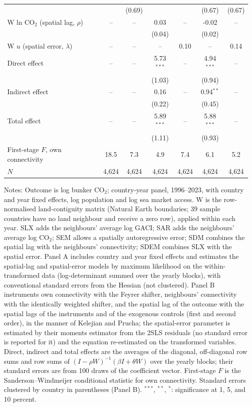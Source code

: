 \begin{table}[htbp]
\begin{threeparttable}
\begin{tabular}{lcccccc}
   &  & (0.69) &  &  & (0.67) & (0.67) \\
  W ln CO$_2$ (spatial lag, $\rho$) & -- & -- & 0.03 & -- & -0.02 & -- \\
   &  &  & (0.04) &  & (0.02) &  \\
  W $u$ (spatial error, $\lambda$) & -- & -- & -- & 0.10 & -- & 0.14 \\
  Direct effect & -- & -- & 5.73$^{***}$ & -- & 4.94$^{***}$ & -- \\
   &  &  & (1.03) &  & (0.94) &  \\
  Indirect effect & -- & -- & 0.16 & -- & 0.94$^{**}$ & -- \\
   &  &  & (0.22) &  & (0.45) &  \\
  Total effect & -- & -- & 5.89$^{***}$ & -- & 5.88$^{***}$ & -- \\
   &  &  & (1.11) &  & (0.93) &  \\
  First-stage $F$, own connectivity & 18.5 & 7.3 & 4.9 & 7.4 & 6.1 & 5.2 \\
  $N$ & 4,624 & 4,624 & 4,624 & 4,624 & 4,624 & 4,624 \\
\bottomrule
\end{tabular}
\begin{tablenotes}[flushleft]
\footnotesize
\item Notes: Outcome is log bunker CO$_2$; country-year panel, 1996--2023, with country and year fixed effects, log population and log sea market access. W is the row-normalised land-contiguity matrix (Natural Earth boundaries; 39 sample countries have no land neighbour and receive a zero row), applied within each year. SLX adds the neighbours' average log GACI; SAR adds the neighbours' average log CO$_2$; SEM allows a spatially autoregressive error; SDM combines the spatial lag with the neighbours' connectivity; SDEM combines SLX with the spatial error. Panel A includes country and year fixed effects and estimates the spatial-lag and spatial-error models by maximum likelihood on the within-transformed data (log-determinant summed over the yearly blocks), with conventional standard errors from the Hessian (not clustered). Panel B instruments own connectivity with the Feyrer shifter, neighbours' connectivity with the identically weighted shifter, and the spatial lag of the outcome with the spatial lags of the instruments and of the exogenous controls (first and second order), in the manner of Kelejian and Prucha; the spatial-error parameter is estimated by their moments estimator from the 2SLS residuals (no standard error is reported for it) and the equation re-estimated on the transformed variables. Direct, indirect and total effects are the averages of the diagonal, off-diagonal row sums and row sums of $(I-\rho W)^{-1}(\beta I + \theta W)$ over the yearly blocks; their standard errors are from 100 draws of the coefficient vector. First-stage $F$ is the Sanderson--Windmeijer conditional statistic for own connectivity. Standard errors clustered by country in parentheses (Panel B). $^{***}$, $^{**}$, $^{*}$: significance at 1, 5, and 10 percent.
\end{tablenotes}
\end{threeparttable}
\end{table}

